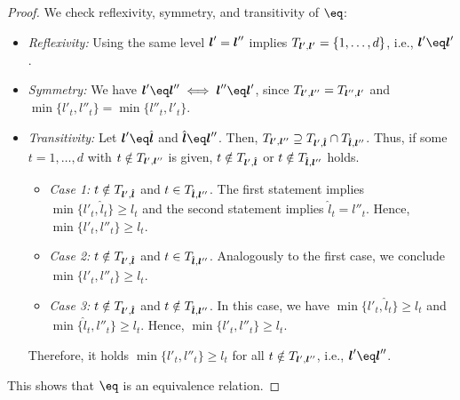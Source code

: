 \begin{proof}
  We check reflexivity, symmetry, and transitivity of $\eq$:
  \begin{itemize}
    \item
    \emph{Reflexivity:}
    Using the same level ${\boldsymbol{l}}' = {\boldsymbol{l}}''$ implies
    $T_{{\boldsymbol{l}}',{\boldsymbol{l}}'} = \{1, \dotsc, d\}$,
    i.e., $\*l' \eq \*l'$.
    
    \item
    \emph{Symmetry:}
    We have
    $\*l' \eq \*l'' \iff \*l'' \eq \*l'$, since
    $T_{{\boldsymbol{l}}',{\boldsymbol{l}}''} = T_{{\boldsymbol{l}}'',{\boldsymbol{l}}'}$ and
    $\min\{l'_t, l''_t\} = \min\{l''_t, l'_t\}$.
    
    \item
    \emph{Transitivity:}
    Let $\*l' \eq \hat{\*l}$ and $\hat{\*l} \eq \*l''$.
    Then, $T_{{\boldsymbol{l}}',{\boldsymbol{l}}''} \supseteq T_{{\boldsymbol{l}}',\hat{{\boldsymbol{l}}}} \cap T_{\hat{{\boldsymbol{l}}},{\boldsymbol{l}}''}$.
    Thus, if some $t = 1, \dotsc, d$ with $t \notin T_{{\boldsymbol{l}}',{\boldsymbol{l}}''}$ is given,
    $t \notin T_{{\boldsymbol{l}}',\hat{{\boldsymbol{l}}}}$ or $t \notin T_{\hat{{\boldsymbol{l}}},{\boldsymbol{l}}''}$ holds.
    \begin{itemize}
      \item
      \emph{Case 1:}
      $t \notin T_{{\boldsymbol{l}}',\hat{{\boldsymbol{l}}}}$ and $t \in T_{\hat{{\boldsymbol{l}}},{\boldsymbol{l}}''}$.
      The first statement implies $\min\{l'_t, \hat{l}_t\} \ge l_t$
      and the second statement implies $\hat{l}_t = l''_t$.
      Hence,
      $\min\{l'_t, l''_t\} \ge l_t$.
      
      \item
      \emph{Case 2:}
      $t \notin T_{{\boldsymbol{l}}',\hat{{\boldsymbol{l}}}}$ and $t \in T_{\hat{{\boldsymbol{l}}},{\boldsymbol{l}}''}$.
      Analogously to the first case, we conclude $\min\{l'_t, l''_t\} \ge l_t$.
      
      \item
      \emph{Case 3:}
      $t \notin T_{{\boldsymbol{l}}',\hat{{\boldsymbol{l}}}}$ and $t \notin T_{\hat{{\boldsymbol{l}}},{\boldsymbol{l}}''}$.
      In this case, we have
      $\min\{l'_t, \hat{l}_t\} \ge l_t$ and $\min\{\hat{l}_t, l''_t\} \ge l_t$.
      Hence,
      $\min\{l'_t, l''_t\} \ge l_t$.
    \end{itemize}
    Therefore, it holds $\min\{l'_t, l''_t\} \ge l_t$
    for all $t \notin T_{{\boldsymbol{l}}',{\boldsymbol{l}}''}$, i.e., $\*l' \eq \*l''$.
  \end{itemize}
  This shows that $\eq$ is an equivalence relation.
\end{proof}

\lemmaCombiTechniqueIdenticalValues*

